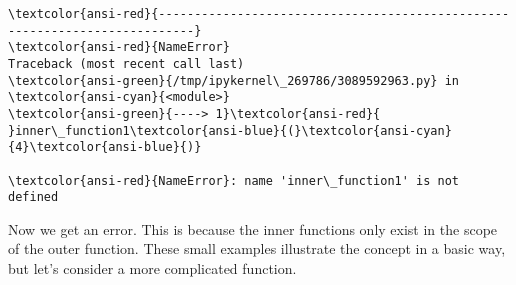     \begin{Verbatim}[commandchars=\\\{\}, frame=single, framerule=2mm, rulecolor=\color{outerrorbackground}]
\textcolor{ansi-red}{---------------------------------------------------------------------------}
\textcolor{ansi-red}{NameError}                                 Traceback (most recent call last)
\textcolor{ansi-green}{/tmp/ipykernel\_269786/3089592963.py} in \textcolor{ansi-cyan}{<module>}
\textcolor{ansi-green}{----> 1}\textcolor{ansi-red}{ }inner\_function1\textcolor{ansi-blue}{(}\textcolor{ansi-cyan}{4}\textcolor{ansi-blue}{)}

\textcolor{ansi-red}{NameError}: name 'inner\_function1' is not defined
    \end{Verbatim}

    Now we get an error. This is because the inner functions only exist in
the scope of the outer function. These small examples illustrate the
concept in a basic way, but let's consider a more complicated function.

